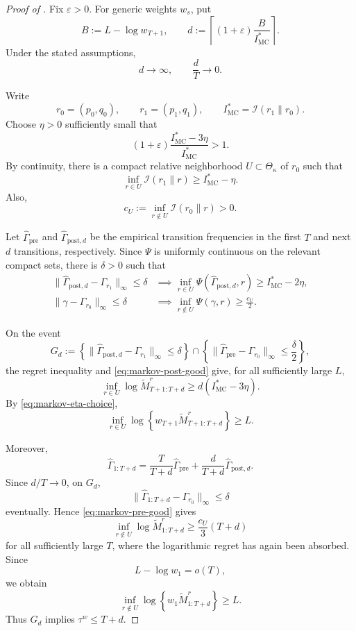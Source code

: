 \documentclass[12pt]{article}
\theoremstyle{spaced}
\theoremstyle{remark}
\begin{document}
\begin{proof}[Proof of ]
Fix \(\varepsilon>0\). For generic weights \(w_s\), put
\[
    B:=L-\log w_{T+1},
    \qquad
    d
    :=
    \left\lceil
        (1+\varepsilon)
        \frac{B}{I_{\mathrm{MC}}^*}
    \right\rceil.
\]
Under the stated assumptions,
\[
    d\to\infty,
    \qquad
    \frac dT\to0.
\]

Write
\[
    r_0=(p_0,q_0),
    \qquad
    r_1=(p_1,q_1),
    \qquad
    I_{\mathrm{MC}}^*
    =
    \mathcal I(r_1\|r_0).
\]
Choose \(\eta>0\) sufficiently small that
\begin{equation}
\label{eq:markov-eta-choice}
    (1+\varepsilon)
    \frac{I_{\mathrm{MC}}^*-3\eta}
         {I_{\mathrm{MC}}^*}
    >1.
\end{equation}
By continuity, there is a compact relative neighborhood
\(U\subset\Theta_\kappa\) of \(r_0\) such that
\[
    \inf_{r\in U}\mathcal I(r_1\|r)
    \ge I_{\mathrm{MC}}^*-\eta.
\]
Also,
\[
    c_U
    :=
    \inf_{r\notin U}\mathcal I(r_0\|r)
    >0.
\]

Let \(\widehat\Gamma_{\mathrm{pre}}\) and
\(\widehat\Gamma_{\mathrm{post},d}\) be the empirical transition
frequencies in the first \(T\) and next \(d\) transitions,
respectively. Since \(\Psi\) is uniformly continuous on the relevant
compact sets, there is \(\delta>0\) such that
\begin{align}
    \|\widehat\Gamma_{\mathrm{post},d}-\Gamma_{r_1}\|_\infty
    \le\delta
    &\implies
    \inf_{r\in U}
    \Psi(\widehat\Gamma_{\mathrm{post},d},r)
    \ge I_{\mathrm{MC}}^*-2\eta,
    \label{eq:markov-post-good}\\
    \|\gamma-\Gamma_{r_0}\|_\infty\le\delta
    &\implies
    \inf_{r\notin U}\Psi(\gamma,r)
    \ge \frac{c_U}{2}.
    \label{eq:markov-pre-good}
\end{align}

On the event
\[
    G_d
    :=
    \left\{
        \|\widehat\Gamma_{\mathrm{post},d}
          -\Gamma_{r_1}\|_\infty\le\delta
    \right\}
    \cap
    \left\{
        \|\widehat\Gamma_{\mathrm{pre}}
          -\Gamma_{r_0}\|_\infty\le\frac{\delta}{2}
    \right\},
\]
the regret inequality and \eqref{eq:markov-post-good} give, for all
sufficiently large \(L\),
\[
    \inf_{r\in U}
    \log\widetilde M_{T+1:T+d}^{r}
    \ge
    d(I_{\mathrm{MC}}^*-3\eta).
\]
By \eqref{eq:markov-eta-choice},
\[
    \inf_{r\in U}
    \log\left\{
        w_{T+1}\widetilde M_{T+1:T+d}^{r}
    \right\}
    \ge L.
\]

Moreover,
\[
    \widehat\Gamma_{1:T+d}
    =
    \frac{T}{T+d}\widehat\Gamma_{\mathrm{pre}}
    +
    \frac{d}{T+d}\widehat\Gamma_{\mathrm{post},d}.
\]
Since \(d/T\to0\), on \(G_d\),
\[
    \|\widehat\Gamma_{1:T+d}-\Gamma_{r_0}\|_\infty
    \le\delta
\]
eventually. Hence \eqref{eq:markov-pre-good} gives
\[
    \inf_{r\notin U}
    \log\widetilde M_{1:T+d}^{r}
    \ge
    \frac{c_U}{3}(T+d)
\]
for all sufficiently large \(T\), where the logarithmic regret has
again been absorbed. Since
\[
    L-\log w_1=o(T),
\]
we obtain
\[
    \inf_{r\notin U}
    \log\left\{
        w_1\widetilde M_{1:T+d}^{r}
    \right\}
    \ge L.
\]
Thus \(G_d\) implies \(\tau^w\le T+d\).


\end{proof}
\end{document}
